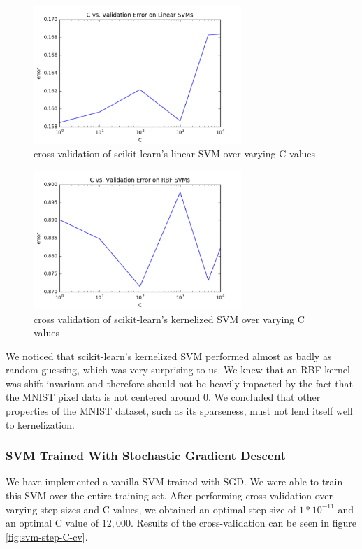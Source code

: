 \documentclass{article} %
\begin{document}
\begin{figure}[h]
\centering
\includegraphics[width=0.7\textwidth]{sklearn-svm-c-cv.png}
\caption{cross validation of scikit-learn's linear SVM over varying C values}
\label{fig:sklearn-sv-c-cv}
\end{figure}

\begin{figure}[h]
\centering
\includegraphics[width=0.7\textwidth]{sklearn-svm-kernel-c-cv.png}
\caption{cross validation of scikit-learn's kernelized SVM over varying C values}
\label{fig:sklearn-svm-kernel-c-cv}
\end{figure}

We noticed that scikit-learn's kernelized SVM performed almost as badly as
random guessing, which was very surprising to us. We knew that an RBF kernel was
shift invariant and therefore should not be heavily impacted by the fact that
the MNIST pixel data is not centered around 0. We concluded that other
properties of the MNIST dataset, such as its sparseness, must not lend itself
well to kernelization.

\subsubsection{SVM Trained With Stochastic Gradient Descent}
We have implemented a vanilla SVM trained with SGD. We were able to train this
SVM over the entire training set. After performing cross-validation
over varying step-sizes and C values, we obtained an optimal step size of $1 *
10^{-11}$ and an optimal C value of $12,000$. Results of the cross-validation
can be seen in figure \ref{fig:svm-step-C-cv}.
\end{document}
